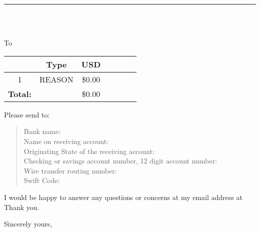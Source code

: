 \documentclass{letter} %
\begin{document}
\signature{}                      %
\longindentation=0pt                       %
\let\raggedleft\raggedright                %
 
 
\begin{letter}{}

\begin{flushleft}
{\large\bf } %
\end{flushleft}
\medskip\hrule height 1pt
\begin{flushright}
\hfill  \\ %
\hfill  \\ %
\hfill %
\end{flushright} 
\vfill %

 
\opening{To %
}


\begin{center}
\begin{tabular}{ccccccc} \hline
& {\bf Type} & USD \\ \hline
1 & REASON & \$0.00 \\ \hline
{\bf Total:} &  & \$0.00 \\ \hline
\end{tabular}
\end{center}

Please send to: 
\begin{quote}
Bank name: \\ %
Name on receiving account: \\ %
Originating State of the receiving account: \\ %
Checking or savings account number, 12 digit account number: \\ %
Wire transfer routing number: \\ %
Swift Code:  %
\end{quote}

I would be happy to answer any questions or concerns at my email address at 
Thank you. 

\closing{Sincerely yours,} 

\end{letter}
 
\end{document}
